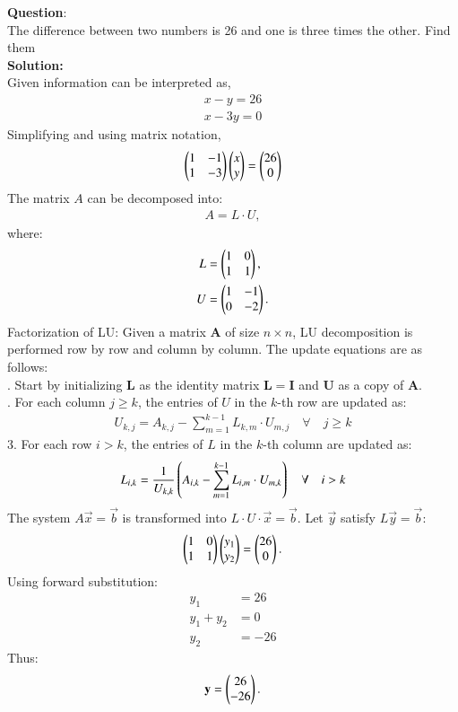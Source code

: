 \documentclass[journal]{IEEEtran}
\begin{document}
\textbf{Question}:\\
The difference between two numbers is 26 and one is three times the other. Find them
\\
\textbf{Solution: }\\
Given information can be interpreted as,
\begin{align}
    x - y = 26\\
    x - 3y = 0
\end{align}
Simplifying and using matrix notation,
\begin{align}
    \begin{pmatrix}
        1 & -1\\
        1 & -3
    \end{pmatrix} \begin{pmatrix}x \\ y\end{pmatrix}= \begin{pmatrix} 26 \\ 0\end{pmatrix}
\end{align}
The matrix $A$ can be decomposed into:
\begin{align}
    A = L \cdot U,
\end{align}
where:
\begin{align}
    L &= \begin{pmatrix}1 & 0 \\ 1 & 1\end{pmatrix}, \\
    U &= \begin{pmatrix}1 & -1 \\ 0 & -2\end{pmatrix}.
\end{align}
\newline
Factorization of LU:\newline
Given a matrix $ \mathbf{A} $ of size $ n \times n $, LU decomposition is performed row by row and column by column. The update equations are as follows: \\ 
. Start by initializing $ \mathbf{L} $ as the identity matrix $ \mathbf{L} = \mathbf{I} $ and $ \mathbf{U} $ as a copy of $ \mathbf{A} $.\\
. For each column $ j \geq k $, the entries of $ U $ in the $ k $-th row are updated as:
\begin{align}
U_{k,j} = A_{k,j} - \sum_{m=1}^{k-1} L_{k,m} \cdot U_{m,j}\quad \forall \quad j \geq k
\end{align}
3. For each row $ i > k $, the entries of $ L $ in the $ k $-th column are updated as:
\begin{align}
L_{i,k} = \frac{1}{U_{k,k}} \left( A_{i,k} - \sum_{m=1}^{k-1} L_{i,m} \cdot U_{m,k}\right) \quad \forall \quad i > k
\end{align}
The system $A\vec{x} = \vec{b}$ is transformed into $L \cdot U \cdot \vec{x} = \vec{b}$. Let $\vec{y}$ satisfy $L\vec{y} = \vec{b}$:
\begin{align}
    \begin{pmatrix}1 & 0 \\ 1 & 1\end{pmatrix} \begin{pmatrix}y_1 \\ y_2\end{pmatrix} = \begin{pmatrix}26 \\ 0\end{pmatrix}.
\end{align}
Using forward substitution:
\begin{align}
    y_1 &= 26 \\
    y_1 + y_2 &= 0\\
    y_2 &= -26
\end{align}
Thus:
\begin{align}
    \mathbf{y} = \begin{pmatrix}26 \\ -26\end{pmatrix}.
\end{align}
\end{document}
